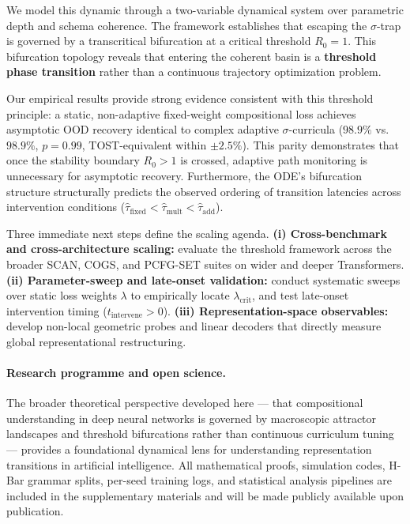 \documentclass{article}
\theoremstyle{definition}
\begin{document}
We model this dynamic through a two-variable dynamical system over parametric depth and schema coherence. The framework establishes that escaping the $\sigma$-trap is governed by a transcritical bifurcation at a critical threshold $R_0 = 1$. This bifurcation topology reveals that entering the coherent basin is a \textbf{threshold phase transition} rather than a continuous trajectory optimization problem. 

Our empirical results provide strong evidence consistent with this threshold principle: a static, non-adaptive fixed-weight compositional loss achieves asymptotic OOD recovery identical to complex adaptive $\sigma$-curricula ($98.9\%$ vs.\ $98.9\%$, $p = 0.99$, TOST-equivalent within $\pm 2.5\%$). This parity demonstrates that once the stability boundary $R_0 > 1$ is crossed, adaptive path monitoring is unnecessary for asymptotic recovery. Furthermore, the ODE's bifurcation structure structurally predicts the observed ordering of transition latencies across intervention conditions ($\hat{\tau}_{\text{fixed}} < \hat{\tau}_{\text{mult}} < \hat{\tau}_{\text{add}}$).

Three immediate next steps define the scaling agenda. \textbf{(i) Cross-benchmark and cross-architecture scaling:} evaluate the threshold framework across the broader SCAN, COGS, and PCFG-SET suites on wider and deeper Transformers. \textbf{(ii) Parameter-sweep and late-onset validation:} conduct systematic sweeps over static loss weights $\lambda$ to empirically locate $\lambda_{\text{crit}}$, and test late-onset intervention timing ($t_{\text{intervene}} > 0$). \textbf{(iii) Representation-space observables:} develop non-local geometric probes and linear decoders that directly measure global representational restructuring.

\paragraph*{Research programme and open science.}
The broader theoretical perspective developed here --- that compositional understanding in deep neural networks is governed by macroscopic attractor landscapes and threshold bifurcations rather than continuous curriculum tuning --- provides a foundational dynamical lens for understanding representation transitions in artificial intelligence. All mathematical proofs, simulation codes, H-Bar grammar splits, per-seed training logs, and statistical analysis pipelines are included in the supplementary materials and will be made publicly available upon publication.
\end{document}
